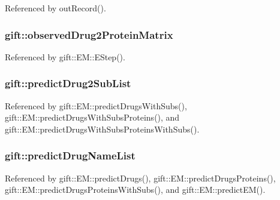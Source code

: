 Referenced by out\+Record().

\subsubsection[{\texorpdfstring{observed\+Drug2\+Protein\+Matrix}{observedDrug2ProteinMatrix}}]{ gift\+::observed\+Drug2\+Protein\+Matrix}\hypertarget{namespacegift_ad84dd6f05c58f2f2061db7ab70bd5471}{}\label{namespacegift_ad84dd6f05c58f2f2061db7ab70bd5471}


Referenced by gift\+::\+E\+M\+::\+E\+Step().

\subsubsection[{\texorpdfstring{predict\+Drug2\+Sub\+List}{predictDrug2SubList}}]{ gift\+::predict\+Drug2\+Sub\+List}\hypertarget{namespacegift_a00bda5cc17262f36063eed0fbf03459c}{}\label{namespacegift_a00bda5cc17262f36063eed0fbf03459c}


Referenced by gift\+::\+E\+M\+::predict\+Drugs\+With\+Subs(), gift\+::\+E\+M\+::predict\+Drugs\+With\+Subs\+Proteins(), and gift\+::\+E\+M\+::predict\+Drugs\+With\+Subs\+Proteins\+With\+Subs().

\subsubsection[{\texorpdfstring{predict\+Drug\+Name\+List}{predictDrugNameList}}]{ gift\+::predict\+Drug\+Name\+List}\hypertarget{namespacegift_a9cc6da68eeea28ac6c6a65cd9f248e5b}{}\label{namespacegift_a9cc6da68eeea28ac6c6a65cd9f248e5b}


Referenced by gift\+::\+E\+M\+::predict\+Drugs(), gift\+::\+E\+M\+::predict\+Drugs\+Proteins(), gift\+::\+E\+M\+::predict\+Drugs\+Proteins\+With\+Subs(), and gift\+::\+E\+M\+::predict\+E\+M().

